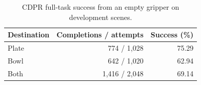 \begin{table}[!htb]
\caption{CDPR full-task success from an empty gripper on development scenes.}
\label{tab:cdpr}\centering\small
\setlength{\tabcolsep}{4pt}
\begin{tabular}{@{}lrr@{}}\toprule
Destination & Completions / attempts & Success (\%)\\\midrule
Plate & 774 / 1,028 & 75.29\\
Bowl & 642 / 1,020 & 62.94\\
Both & 1,416 / 2,048 & 69.14\\\bottomrule
\end{tabular}
\end{table}
